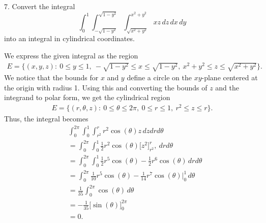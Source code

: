 \documentclass{report}
\begin{document}
    \bigbreak \noindent 
    \begin{mdframed}
        7. Convert the integral
        \[
            \int_0^1 \int_{-\sqrt{1-y^2}}^{\sqrt{1-y^2}} \int_{\sqrt{x^2 + y^2}}^{x^2 + y^2} xz \, dz \, dx \, dy
        \]
        into an integral in cylindrical coordinates.
    \end{mdframed}
    \bigbreak \noindent 
    We express the given integral as the region 
    \begin{align*}
    E=\{(x,y,z):\ 0 \leq y \leq 1,\ -\sqrt{1-y^{2}} \leq x \leq\sqrt{1-y^{2}},\ x^{2} + y^{2} \leq z \leq \sqrt{x^{2}+y^{2}}\}
    .\end{align*}
    \bigbreak \noindent 
    We notice that the bounds for $x$ and $y$ define a circle on the $xy$-plane centered at the origin with radius 1. Using this and converting the bounds of $z$ and the integrand to polar form, we get the cylindrical region
    \begin{align*}
        E = \{(r,\theta ,z):\ 0 \leq \theta \leq 2\pi,\ 0 \leq r \leq 1,\ r^{2} \leq z \leq r \}
    .\end{align*}
    Thus, the integral becomes
    \begin{align*}
        &\int_{0 }^{2\pi }\int_{0}^{1}\int_{r^{2}}^{r}r^{2}\cos{\left(\theta \right)}z  \, dzdrd\theta  \\
        &=\int_{0}^{2\pi }\int_{0}^{1} \frac{1}{2}r^{2}\cos{\left(\theta \right)}\big[z^{2}\big]_{r^{2}}^{r},\ drd\theta   \\
        &=\int_{0}^{2\pi}\int_{0}^{1} \frac{1}{2}r^{5}\cos{\left(\theta \right)} - \frac{1}{2}r^{6}\cos{\left(\theta \right)} \, drd\theta  \\
        &=\int_{0}^{2\pi} \frac{1}{10}r^{5}\cos{\left(\theta \right)} -\frac{1}{14}r^{7}\cos{\left(\theta \right)}\bigg|^{1}_{0}\, d\theta  \\
        &= \frac{1}{35}\int_{0}^{2\pi}  \cos{\left(\theta \right)}\, d\theta  \\
        &=-\frac{1}{35}\big[\sin{\left(\theta \right)}\big]_{0}^{2\pi} \\
        &= 0
    .\end{align*}






 
\end{document}
